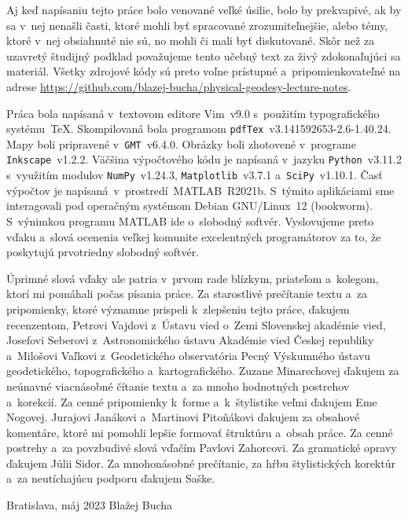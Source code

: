 \documentclass[a4paper, 12pt]{book}
\begin{document}
Aj keď napísaniu tejto práce bolo venované veľké úsilie, bolo by prekvapivé, ak 
by sa v~nej nenašli časti, ktoré mohli byť spracované zrozumiteľnejšie, alebo 
témy, ktoré v~nej obsiahnuté nie sú, no mohli či mali byť diskutované.  Skôr 
než za uzavretý študijný podklad považujeme tento učebný text za živý 
zdokonaľujúci sa materiál.  Všetky zdrojové kódy sú preto voľne prístupné 
a~pripomienkovateľné na adrese 
\url{https://github.com/blazej-bucha/physical-geodesy-lecture-notes}.

Práca bola napísaná v~textovom editore Vim~v9.0 s~použitím typografického 
systému~\TeX.  Skompilovaná bola programom 
\texttt{pdfTex}~v3.141592653-2.6-1.40.24.  Mapy boli pripravené 
v~\texttt{GMT}~v6.4.0.  Obrázky boli zhotovené v~programe 
\texttt{Inkscape}~v1.2.2.  Väčšina výpočtového kódu je napísaná v~jazyku 
\texttt{Python}~v3.11.2 s~využitím modulov \texttt{NumPy}~v1.24.3, 
\texttt{Matplotlib}~v3.7.1 a~\texttt{SciPy}~v1.10.1.  Časť výpočtov je 
napísaná~v~prostredí~MATLAB~R2021b.  S~týmito aplikáciami sme interagovali pod 
operačným systémom Debian GNU/Linux~12 (bookworm).  S~výnimkou programu MATLAB 
ide o~slobodný softvér.  Vyslovujeme preto vďaku a~slová ocenenia veľkej 
komunite excelentných programátorov za to, že poskytujú prvotriedny slobodný 
softvér.

Úprimné slová vďaky ale patria v~prvom rade blízkym, priateľom a~kolegom, ktorí 
mi pomáhali počas písania práce.  Za starostlivé prečítanie textu a~za 
pripomienky, ktoré významne prispeli k~zlepšeniu tejto práce, ďakujem 
recenzentom, Petrovi Vajdovi z~Ústavu vied o~Zemi Slovenskej akadémie vied, 
Josefovi Seberovi z~Astronomického ústavu Akadémie vied Českej republiky 
a~Milošovi Vaľkovi z~Geodetického observatória Pecný Výskumného ústavu 
geodetického, topografického a~kartografického.  Zuzane Minarechovej ďakujem za 
neúnavné viacnásobné čítanie textu a~za mnoho hodnotných postrehov a~korekcií.  
Za cenné pripomienky k~forme a~k~štylistike veľmi ďakujem Eme Nogovej.  
Jurajovi Janákovi a~Martinovi Pitoňákovi ďakujem za obsahové komentáre, ktoré 
mi pomohli lepšie formovať štruktúru a~obsah práce.  Za cenné postrehy a~za 
povzbudivé slová vďačím Pavlovi Zahorcovi.  Za gramatické opravy ďakujem Júlii 
Sidor.  Za mnohonásobné prečítanie, za hŕbu štylistických korektúr a~za 
neutíchajúcu podporu ďakujem Saške.


\vspace{4ex}

\noindent Bratislava, máj 2023 \hfill Blažej Bucha
\end{document}
